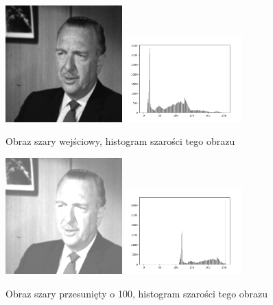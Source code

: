 \documentclass[final,a4paper,openany,12pt]{mwbk}
\begin{document}
\begin{figure}[H]
	\begin{center}
		\includegraphics[width=0.4\textwidth]{gentelman_gray}
		\includegraphics[width=0.4\textwidth]{gentelman_gray_histogram}
	\end{center}
	\caption{Obraz szary wejściowy, histogram szarości tego obrazu}
\end{figure}

\begin{figure}[H]
	\begin{center}
		\includegraphics[width=0.4\textwidth]{gentelman_gray_moveHist_result}
		\includegraphics[width=0.4\textwidth]{gentelman_gray_moveHist_histogram}
	\end{center}
	\caption{Obraz szary przesunięty o 100, histogram szarości tego obrazu}
\end{figure}
\end{document}
